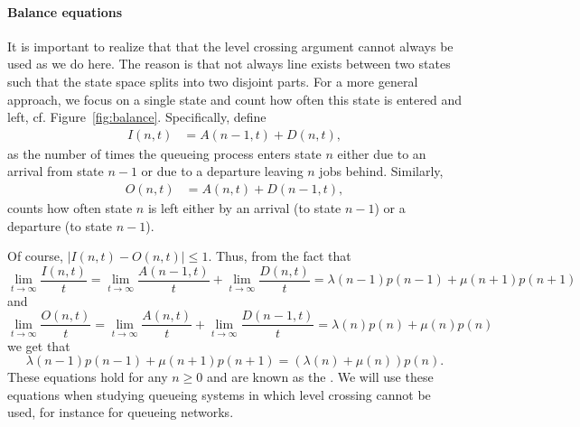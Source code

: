 \paragraph{Balance equations}

It is important to realize that  that the level crossing argument cannot
always be used as we do here. The reason is that not always  line exists between two states such that the state space splits  into two disjoint
parts. For a more general approach, we focus on a single state and
count how often this state is entered and left,
cf. Figure~\ref{fig:balance}. Specifically, define
\begin{align*}
  I(n,t) &= A(n-1,t) + D(n,t),
\end{align*}
as the number of times the queueing process enters state $n$ either
due to an arrival from state $n-1$ or due to a departure leaving $n$
jobs behind. Similarly,
\begin{align*}
 O(n,t) &= A(n,t) + D(n-1,t),
\end{align*}
counts how often state $n$ is left either by an arrival (to state $n-1$) or a departure (to state $n-1$).

Of course, $|I(n,t)-O(n,t)|\leq 1$. Thus, from the fact that
\begin{equation*}
\lim_{t\to\infty}  \frac{I(n,t)}t = \lim_{t\to\infty} \frac{A(n-1,t)}t + \lim_{t\to\infty} \frac{D(n,t)}t = \lambda(n-1) p(n-1) + 
\mu(n+1) p(n+1)
\end{equation*}
and 
\begin{equation*}
\lim_{t\to\infty}   \frac{O(n,t)}t = \lim_{t\to\infty} \frac{A(n,t)}t + \lim_{t\to\infty} \frac{D(n-1,t)}t = \lambda(n) p(n) + 
\mu(n) p(n)
\end{equation*}
we get that
\begin{equation*}
  \lambda(n-1)p(n-1)+\mu(n+1)p(n+1) = (\lambda(n)+\mu(n))p(n).
\end{equation*}
These equations hold for any $n\geq 0$ and are known as the
.  We will use these equations when studying
queueing systems in which level crossing cannot be used, for instance
for queueing networks.

